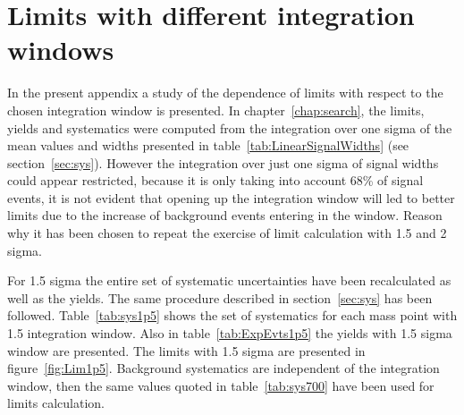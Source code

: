 \chapter{Limits with different integration windows}
\label{chap:windstudy}

In the present appendix a study of the dependence of limits with respect to the chosen integration window is presented. In chapter~\ref{chap:search}, the limits, yields and systematics were computed from the integration over one sigma of the mean values and widths presented in table~\ref{tab:LinearSignalWidths} (see section~\ref{sec:sys}). However the integration over just one sigma of signal widths could appear restricted, because it is only taking into account 68\% of signal events, it is not evident that opening up the integration window will led to better limits due to the increase of background events entering in the window. Reason why it has been chosen to repeat the exercise of limit calculation with 1.5 and 2 sigma.

For 1.5 sigma the entire set of systematic uncertainties have been recalculated as well as the yields. The same procedure described in section~\ref{sec:sys} has been followed. Table~\ref{tab:sys1p5} shows the set of systematics for each mass point with 1.5 integration window. Also in table~\ref{tab:ExpEvts1p5} the yields with 1.5 sigma window are presented. The limits with 1.5 sigma are presented in figure~\ref{fig:Lim1p5}. Background systematics are independent of the integration window, then the same values quoted in table~\ref{tab:sys700} have been used for limits calculation.

